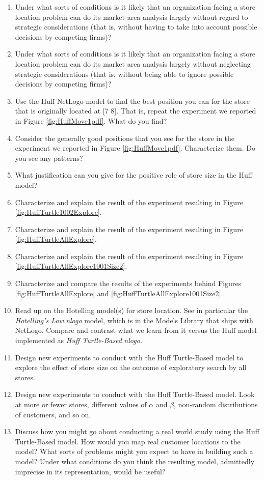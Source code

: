 \begin{enumerate}
\item Under what sorts of conditions is it likely that an organization facing a store location problem can do its market area analysis largely without regard to strategic considerations (that is, without having to take into account possible decisions by competing firms)?
\item Under what sorts of conditions is it likely that an organization facing a store location problem can do its market area analysis largely without neglecting strategic considerations (that is, without being able to ignore possible decisions by competing firms)?
\item Use the Huff NetLogo model to find the best position you can for the store that is originally located at [7 8]. That is, repeat the experiment we reported in Figure \ref{fig:HuffMove1pdf}. What do you find?
\item Consider the generally good positions that you see for the store in the experiment we reported in Figure \ref{fig:HuffMove1pdf}. Characterize them. Do you see any patterns?
\item What justification can you give for the positive role of store size in the Huff model? 
\item Characterize and explain the result of the experiment resulting in Figure \ref{fig:HuffTurtle1002Explore}.
\item Characterize and explain the result of the experiment resulting in Figure \ref{fig:HuffTurtleAllExplore}. 
\item Characterize and explain the result of the experiment resulting in Figure \ref{fig:HuffTurtleAllExplore1001Size2}. 

\item Characterize and compare the results of the experiments behind Figures \ref{fig:HuffTurtleAllExplore} and \ref{fig:HuffTurtleAllExplore1001Size2}. 

\item Read up on the Hotelling model(s) for store location. See in particular the {\it Hotelling's Law.nlogo} model, which is in the Models Library that ships with NetLogo.  Compare and contrast what we learn from it versus the Huff model implemented as {\it Huff Turtle-Based.nlogo.}

\item Design new experiments to conduct with the Huff Turtle-Based model to explore the effect of store size on the outcome of exploratory search by all stores.
\item Design new experiments to conduct with the Huff Turtle-Based model. Look at more or fewer  stores, different values of $\alpha$ and $\beta$, non-random distributions of customers, and so on.
\item Discuss how you might go about conducting a real world study using the Huff Turtle-Based model.  How would you map real customer locations to the model? What sorts of problems might you expect to have in building such a model?  Under what conditions do you think the resulting model, admittedly imprecise in its representation, would be useful?
\end{enumerate}

